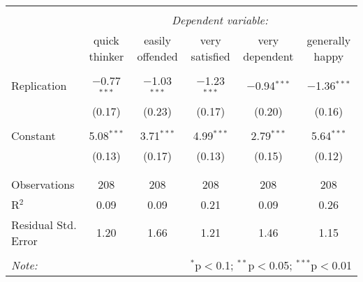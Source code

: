 \documentclass[11pt,]{article}
\begin{document}
\begin{table}[!htbp] \centering 
  \caption{} 
  \label{} 
\begin{tabular}{@{\extracolsep{5pt}}lccccc} 
\\[-1.8ex]\hline 
\hline \\[-1.8ex] 
 & \multicolumn{5}{c}{\textit{Dependent variable:}} \\ 
\cline{2-6} 
 & quick thinker & easily offended & very satisfied & very dependent & generally happy \\ 
\hline \\[-1.8ex] 
 Replication & $-$0.77$^{***}$ & $-$1.03$^{***}$ & $-$1.23$^{***}$ & $-$0.94$^{***}$ & $-$1.36$^{***}$ \\ 
  & (0.17) & (0.23) & (0.17) & (0.20) & (0.16) \\ 
  & & & & & \\ 
 Constant & 5.08$^{***}$ & 3.71$^{***}$ & 4.99$^{***}$ & 2.79$^{***}$ & 5.64$^{***}$ \\ 
  & (0.13) & (0.17) & (0.13) & (0.15) & (0.12) \\ 
  & & & & & \\ 
\hline \\[-1.8ex] 
Observations & 208 & 208 & 208 & 208 & 208 \\ 
R$^{2}$ & 0.09 & 0.09 & 0.21 & 0.09 & 0.26 \\ 
Residual Std. Error & 1.20 & 1.66 & 1.21 & 1.46 & 1.15 \\ 
\hline 
\hline \\[-1.8ex] 
\textit{Note:}  & \multicolumn{5}{r}{$^{*}$p$<$0.1; $^{**}$p$<$0.05; $^{***}$p$<$0.01} \\ 
\end{tabular} 
\end{table}
\end{document}
